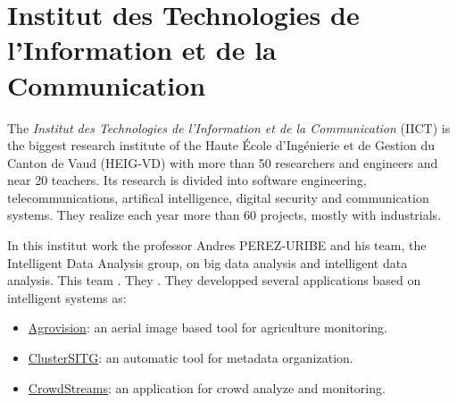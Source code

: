 \documentclass[12pt, a4paper]{report}
\begin{document}
		\section{Institut des Technologies de l’Information et de la Communication}
			The {\itshape Institut des Technologies de l’Information et de la Communication} (IICT) is the biggest research institute of the Haute École d'Ingénierie et de Gestion du Canton de Vaud (HEIG-VD) with more than 50 researchers and engineers and near 20 teachers.
			Its research is divided into software engineering, telecommunications, artifical intelligence, digital security and communication systems.
			They realize each year more than 60 projects, mostly with industrials.\par
			In this institut work the professor Andres PEREZ-URIBE and his team, the Intelligent Data Analysis group, on big data analysis and intelligent data analysis.
			This team .
			They .
			They developped several applications based on intelligent systems as:
			\begin{itemize}
				\item \href{http://iict.heig-vd.ch/projets#/49/agrovision-developpement-dun-outil-de-suivi-base-sur-limagerie-aerienne-a-haute-resolution-pour-une-meilleure-gestion-agronomique-et-environnementale-de-lagriculture}{Agrovision}: an aerial image based tool for agriculture monitoring.
				\item \href{http://iict.heig-vd.ch/projets#/47/clustersitg-semantic-analysis-and-clustering-of-sitg-catalogue}{ClusterSITG}: an automatic tool for metadata organization.
				\item \href{http://iict.heig-vd.ch/projets#/43/crowdstreams-analyse-et-surveillance-en-temps-r-el-de-mobilit-la-proximit-des-grands-v-nements}{CrowdStreams}: an application for crowd analyze and monitoring.
			\end{itemize}
\end{document}

